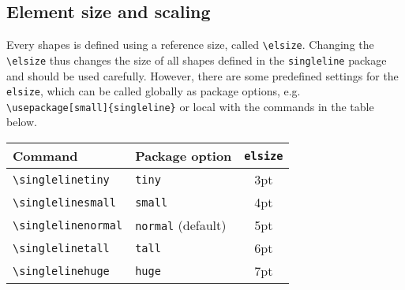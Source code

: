 \documentclass[a4]{article}
\begin{document}
\subsection{Element size and scaling}
Every shapes is defined using a reference size, called \verb+\elsize+. Changing the \verb+\elsize+ thus changes the size of all shapes defined in the \verb+singleline+ package and should be used carefully.
However, there are some predefined settings for the \verb+elsize+, which can be called globally as package options, e.g. \verb+\usepackage[small]{singleline}+ or local with the commands in the table below.
\begin{table}[H]
\centering
\begin{tabular}{llc}
\toprule
\toprule
Command &Package option & \verb+elsize+ \\
\midrule
\verb+\singlelinetiny+ &\verb+tiny+ & 3pt \\
\verb+\singlelinesmall+&\verb+small+ & 4pt \\
\verb+\singlelinenormal+&\verb+normal+ (default) & 5pt \\
\verb+\singlelinetall+&\verb+tall+ & 6pt \\
\verb+\singlelinehuge+&\verb+huge+ & 7pt \\
\bottomrule
\bottomrule
\end{tabular}
\end{table}
\end{document}
